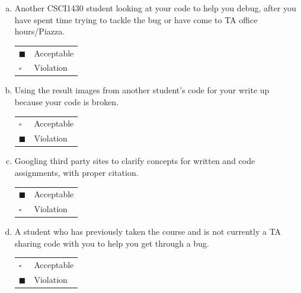 \documentclass[11pt]{article}
\begin{document}
\begin{enumerate}[(a)]
\item
Another CSCI1430 student looking at your code to help you debug, after you have spent time trying to tackle the bug or have come to TA office hours/Piazza.

\begin{tabular}[h]{ll}
$\blacksquare$ & Acceptable \\
$\square$ & Violation \\
\end{tabular}

\item
Using the result images from another student's code for your write up because your code is broken.

\begin{tabular}[h]{ll}
$\square$ & Acceptable \\
$\blacksquare$ & Violation \\
\end{tabular}

\item
Googling third party sites to clarify concepts for written and code assignments, with proper citation.

\begin{tabular}[h]{ll}
$\blacksquare$ & Acceptable \\
$\square$ & Violation \\
\end{tabular}

\item
A student who has previously taken the course and is not currently a TA sharing code with you to help you get through a bug.

\begin{tabular}[h]{ll}
$\square$ & Acceptable \\
$\blacksquare$ & Violation \\
\end{tabular}

\end{enumerate}




\pagebreak
\end{document}
